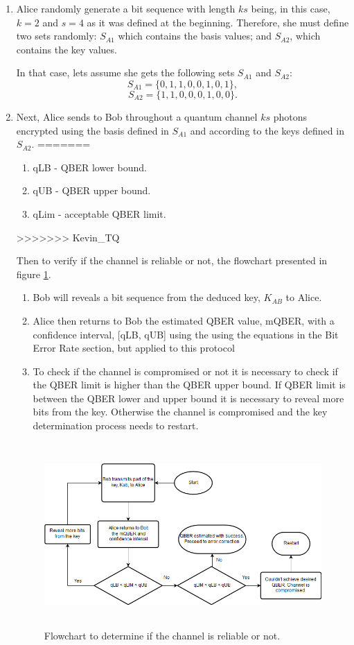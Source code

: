 \begin{enumerate}
  \item Alice randomly generate a bit sequence with length $ks$ being, in this case, $k=2$ and $s=4$ as it was defined at the beginning.
      Therefore, she must define two sets randomly: $S_{A1}$ which contains the basis values; and $S_{A2}$, which contains the key values.

      In that case, lets assume she gets the following sets $S_{A1}$ and $S_{A2}$:
      $$S_{A1} = \{0,1,1,0,0,1,0,1 \},$$
      $$S_{A2} = \{1,1,0,0,0,1,0,0 \}.$$

  \item Next, Alice sends to Bob throughout a quantum channel $ks$ photons encrypted using the basis defined in $S_{A1}$ and according to the keys defined in $S_{A2}$.
=======
	\begin{enumerate}
		\item qLB - QBER lower bound.
		\item qUB - QBER upper bound.
		\item qLim - acceptable QBER limit.
	\end{enumerate}
>>>>>>> Kevin_TQ

	Then to verify if the channel is reliable or not, the flowchart presented in figure \ref{fig:flowQber}.
	
	\begin{enumerate}
		\item Bob will reveals a bit sequence from the deduced key, $K_{AB}$ to Alice. 
		\item Alice then returns to Bob the estimated QBER value, mQBER, with a confidence interval, [qLB, qUB] using the using the equations in the Bit Error Rate section, but applied to this protocol
		\item To check if the channel is compromised or not it is necessary to check if the QBER limit is higher than the QBER upper bound. If QBER limit is between the QBER lower and upper bound it is necessary to reveal more bits from the key. Otherwise the channel is compromised and the key determination process needs to restart. 
	\end{enumerate}
	
	
\begin{figure}[H]
	\centering
	\includegraphics[width=1\textwidth,height=7cm]{./sdf/bb84_with_discrete_variables/figures/qberEstimation.png}
	\caption{Flowchart to determine if the channel is reliable or not.}\label{fig:flowQber}
\end{figure}




\end{enumerate}
